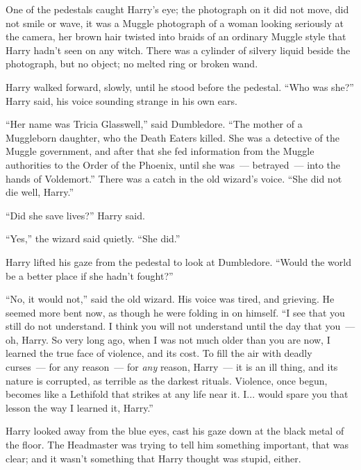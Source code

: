 One of the pedestals caught Harry's eye; the photograph on it did not move, did not smile or wave, it was a Muggle photograph of a woman looking seriously at the camera, her brown hair twisted into braids of an ordinary Muggle style that Harry hadn't seen on any witch. There was a cylinder of silvery liquid beside the photograph, but no object; no melted ring or broken wand.

Harry walked forward, slowly, until he stood before the pedestal. ``Who was she?'' Harry said, his voice sounding strange in his own ears.

``Her name was Tricia Glasswell,'' said Dumbledore. ``The mother of a Muggleborn daughter, who the Death Eaters killed. She was a detective of the Muggle government, and after that she fed information from the Muggle authorities to the Order of the Phoenix, until she was~--- betrayed~--- into the hands of Voldemort.'' There was a catch in the old wizard's voice. ``She did not die well, Harry.''

``Did she save lives?'' Harry said.

``Yes,'' the wizard said quietly. ``She did.''

Harry lifted his gaze from the pedestal to look at Dumbledore. ``Would the world be a better place if she hadn't fought?''

``No, it would not,'' said the old wizard. His voice was tired, and grieving. He seemed more bent now, as though he were folding in on himself. ``I see that you still do not understand. I think you will not understand until the day that you~--- oh, Harry. So very long ago, when I was not much older than you are now, I learned the true face of violence, and its cost. To fill the air with deadly curses~--- for any reason~--- for \emph{any} reason, Harry~--- it is an ill thing, and its nature is corrupted, as terrible as the darkest rituals. Violence, once begun, becomes like a Lethifold that strikes at any life near it. I... would spare you that lesson the way I learned it, Harry.''

Harry looked away from the blue eyes, cast his gaze down at the black metal of the floor. The Headmaster was trying to tell him something important, that was clear; and it wasn't something that Harry thought was stupid, either.

